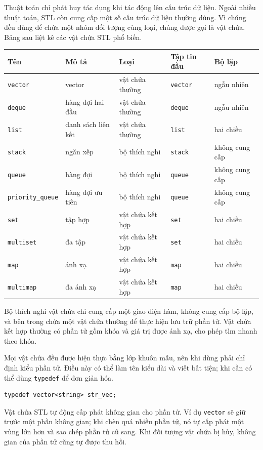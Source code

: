 \documentclass[11pt]{article}
\begin{document}
Thuật toán chỉ phát huy tác dụng khi tác động lên cấu trúc dữ liệu. Ngoài
nhiều thuật toán, STL còn cung cấp một số cấu trúc dữ liệu thường dùng. Vì
chúng đều dùng để chứa một nhóm đối tượng cùng loại, chúng được gọi là vật
chứa. Bảng sau liệt kê các vật chứa STL phổ biến.

\begin{center}
\small
\begin{tabular}{lllll}
\hline
\textbf{Tên} & \textbf{Mô tả} & \textbf{Loại} & \textbf{Tập tin đầu} &
\textbf{Bộ lặp}\\
\hline
\verb|vector| & vector & vật chứa thường & \verb|vector| & ngẫu nhiên\\
\verb|deque| & hàng đợi hai đầu & vật chứa thường & \verb|deque| & ngẫu nhiên\\
\verb|list| & danh sách liên kết & vật chứa thường & \verb|list| & hai chiều\\
\verb|stack| & ngăn xếp & bộ thích nghi & \verb|stack| & không cung cấp\\
\verb|queue| & hàng đợi & bộ thích nghi & \verb|queue| & không cung cấp\\
\verb|priority_queue| & hàng đợi ưu tiên & bộ thích nghi & \verb|queue| & không cung cấp\\
\verb|set| & tập hợp & vật chứa kết hợp & \verb|set| & hai chiều\\
\verb|multiset| & đa tập & vật chứa kết hợp & \verb|set| & hai chiều\\
\verb|map| & ánh xạ & vật chứa kết hợp & \verb|map| & hai chiều\\
\verb|multimap| & đa ánh xạ & vật chứa kết hợp & \verb|map| & hai chiều\\
\hline
\end{tabular}
\end{center}

Bộ thích nghi vật chứa chỉ cung cấp một giao diện hàm, không cung cấp bộ lặp,
và bên trong chứa một vật chứa thường để thực hiện lưu trữ phần tử. Vật chứa
kết hợp thường có phần tử gồm khóa và giá trị được ánh xạ, cho phép tìm nhanh
theo khóa.

Mọi vật chứa đều được hiện thực bằng lớp khuôn mẫu, nên khi dùng phải chỉ
định kiểu phần tử. Điều này có thể làm tên kiểu dài và viết bất tiện; khi cần
có thể dùng \verb|typedef| để đơn giản hóa.

\begin{verbatim}
typedef vector<string> str_vec;
\end{verbatim}

Vật chứa STL tự động cấp phát không gian cho phần tử. Ví dụ \verb|vector| sẽ
giữ trước một phần không gian; khi chèn quá nhiều phần tử, nó tự cấp phát một
vùng lớn hơn và sao chép phần tử cũ sang. Khi đối tượng vật chứa bị hủy, không
gian của phần tử cũng tự được thu hồi.
\end{document}
